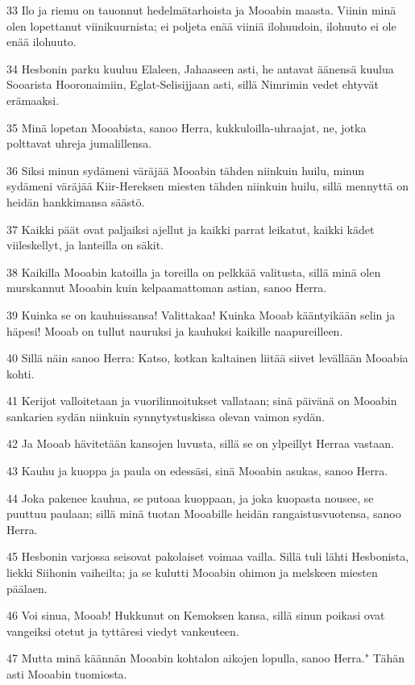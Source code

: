 \par 33 Ilo ja riemu on tauonnut hedelmätarhoista ja Mooabin maasta. Viinin minä olen lopettanut viinikuurnista; ei poljeta enää viiniä ilohuudoin, ilohuuto ei ole enää ilohuuto.
\par 34 Hesbonin parku kuuluu Elaleen, Jahaaseen asti, he antavat äänensä kuulua Sooarista Hooronaimiin, Eglat-Selisijjaan asti, sillä Nimrimin vedet ehtyvät erämaaksi.
\par 35 Minä lopetan Mooabista, sanoo Herra, kukkuloilla-uhraajat, ne, jotka polttavat uhreja jumalillensa.
\par 36 Siksi minun sydämeni väräjää Mooabin tähden niinkuin huilu, minun sydämeni väräjää Kiir-Hereksen miesten tähden niinkuin huilu, sillä mennyttä on heidän hankkimansa säästö.
\par 37 Kaikki päät ovat paljaiksi ajellut ja kaikki parrat leikatut, kaikki kädet viileskellyt, ja lanteilla on säkit.
\par 38 Kaikilla Mooabin katoilla ja toreilla on pelkkää valitusta, sillä minä olen murskannut Mooabin kuin kelpaamattoman astian, sanoo Herra.
\par 39 Kuinka se on kauhuissansa! Valittakaa! Kuinka Mooab kääntyikään selin ja häpesi! Mooab on tullut nauruksi ja kauhuksi kaikille naapureilleen.
\par 40 Sillä näin sanoo Herra: Katso, kotkan kaltainen liitää siivet levällään Mooabia kohti.
\par 41 Kerijot valloitetaan ja vuorilinnoitukset vallataan; sinä päivänä on Mooabin sankarien sydän niinkuin synnytystuskissa olevan vaimon sydän.
\par 42 Ja Mooab hävitetään kansojen luvusta, sillä se on ylpeillyt Herraa vastaan.
\par 43 Kauhu ja kuoppa ja paula on edessäsi, sinä Mooabin asukas, sanoo Herra.
\par 44 Joka pakenee kauhua, se putoaa kuoppaan, ja joka kuopasta nousee, se puuttuu paulaan; sillä minä tuotan Mooabille heidän rangaistusvuotensa, sanoo Herra.
\par 45 Hesbonin varjossa seisovat pakolaiset voimaa vailla. Sillä tuli lähti Hesbonista, liekki Siihonin vaiheilta; ja se kulutti Mooabin ohimon ja melskeen miesten päälaen.
\par 46 Voi sinua, Mooab! Hukkunut on Kemoksen kansa, sillä sinun poikasi ovat vangeiksi otetut ja tyttäresi viedyt vankeuteen.
\par 47 Mutta minä käännän Mooabin kohtalon aikojen lopulla, sanoo Herra." Tähän asti Mooabin tuomiosta.


